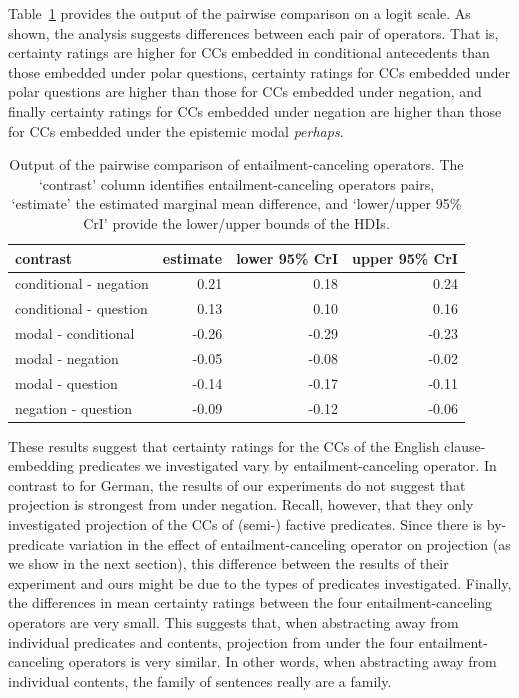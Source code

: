 \documentclass[a4paper,12pt,twoside]{article}
\begin{document}
        Table~\ref{t:pairwise} provides the output of the pairwise comparison on a logit scale.
        As shown, the analysis suggests differences between each pair of operators. That is, certainty ratings are higher for CCs embedded in conditional antecedents than those embedded under polar questions, certainty ratings for CCs embedded under polar questions are higher than those for CCs embedded under negation, and finally certainty ratings for CCs embedded under negation are higher than those for CCs embedded under the epistemic modal \emph{perhaps}.

        \begin{table}[!h]
        \centering
        \begin{tabular}{lrrr}
        \toprule
         contrast & estimate & lower 95\% CrI & upper 95\% CrI \\\midrule
         conditional - negation & 0.21 & 0.18 & 0.24 \\ 
          conditional - question & 0.13 & 0.10 & 0.16 \\ 
          modal - conditional & -0.26 & -0.29 & -0.23 \\ 
          modal - negation & -0.05 & -0.08 & -0.02 \\ 
          modal - question & -0.14 & -0.17 & -0.11 \\ 
          negation - question & -0.09 & -0.12 & -0.06 \\ \bottomrule
        \end{tabular}
        \caption{Output of the pairwise comparison of entailment-canceling operators. The `contrast' column identifies entailment-canceling operators pairs, `estimate' the estimated marginal mean difference, and `lower/upper 95\% CrI' provide the lower/upper bounds of the HDIs.}\label{t:pairwise}
        \end{table}
        
        These results suggest that certainty ratings for the CCs of the English clause-embedding predicates we investigated vary by entailment-canceling operator. In contrast to \citealt{sieker_projective_2022} for German, the results of our experiments do not suggest that projection is strongest from under negation. Recall, however, that they only investigated projection of the CCs of (semi-) factive predicates. Since there is by-predicate variation in the effect of entailment-canceling operator on projection (as we show in the next section), this difference between the results of their experiment and ours might be due to the types of predicates investigated. Finally, the differences in mean certainty ratings between the four entailment-canceling operators are very small. This suggests that, when abstracting away from individual predicates and contents, projection from under the four entailment-canceling operators is very similar. In other words, when abstracting away from individual  contents, the family of sentences really are a family.
 
\end{document}
